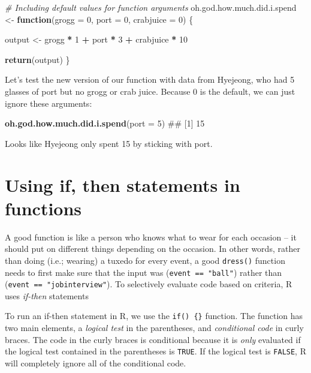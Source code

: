 \documentclass[]{book}
\newenvironment{Shaded}{\begin{snugshade}}{\end{snugshade}}
\newcommand{\KeywordTok}[1]{\textcolor[rgb]{0.13,0.29,0.53}{\textbf{#1}}}
\newcommand{\DataTypeTok}[1]{\textcolor[rgb]{0.13,0.29,0.53}{#1}}
\newcommand{\DecValTok}[1]{\textcolor[rgb]{0.00,0.00,0.81}{#1}}
\newcommand{\StringTok}[1]{\textcolor[rgb]{0.31,0.60,0.02}{#1}}
\newcommand{\CommentTok}[1]{\textcolor[rgb]{0.56,0.35,0.01}{\textit{#1}}}
\newcommand{\ControlFlowTok}[1]{\textcolor[rgb]{0.13,0.29,0.53}{\textbf{#1}}}
\newcommand{\OperatorTok}[1]{\textcolor[rgb]{0.81,0.36,0.00}{\textbf{#1}}}
\newcommand{\NormalTok}[1]{#1}
\theoremstyle{definition}
\theoremstyle{definition}
\theoremstyle{remark}
\begin{document}
\begin{Shaded}
\begin{Highlighting}[]
\CommentTok{# Including default values for function arguments}
\NormalTok{oh.god.how.much.did.i.spend <-}\StringTok{ }\ControlFlowTok{function}\NormalTok{(}\DataTypeTok{grogg =} \DecValTok{0}\NormalTok{,}
                                        \DataTypeTok{port =} \DecValTok{0}\NormalTok{,}
                                        \DataTypeTok{crabjuice =} \DecValTok{0}\NormalTok{) \{}

\NormalTok{  output <-}\StringTok{ }\NormalTok{grogg }\OperatorTok{*}\StringTok{ }\DecValTok{1} \OperatorTok{+}\StringTok{ }\NormalTok{port }\OperatorTok{*}\StringTok{ }\DecValTok{3} \OperatorTok{+}\StringTok{ }\NormalTok{crabjuice }\OperatorTok{*}\StringTok{ }\DecValTok{10}

  \KeywordTok{return}\NormalTok{(output)}
\NormalTok{\}}
\end{Highlighting}
\end{Shaded}

Let's test the new version of our function with data from Hyejeong, who
had 5 glasses of port but no grogg or crab juice. Because 0 is the
default, we can just ignore these arguments:

\begin{Shaded}
\begin{Highlighting}[]
\KeywordTok{oh.god.how.much.did.i.spend}\NormalTok{(}\DataTypeTok{port =} \DecValTok{5}\NormalTok{)}
\NormalTok{## [1] 15}
\end{Highlighting}
\end{Shaded}

Looks like Hyejeong only spent 15 by sticking with port.

\section{Using if, then statements in
functions}\label{using-if-then-statements-in-functions}

A good function is like a person who knows what to wear for each
occasion -- it should put on different things depending on the occasion.
In other words, rather than doing (i.e.; wearing) a tuxedo for every
event, a good \texttt{dress()} function needs to first make sure that
the input was (\texttt{event\ ==\ "ball"}) rather than
(\texttt{event\ ==\ "jobinterview"}). To selectively evaluate code based
on criteria, R uses \emph{if-then} statements

To run an if-then statement in R, we use the \texttt{if()\ \{\}}
function. The function has two main elements, a \emph{logical test} in
the parentheses, and \emph{conditional code} in curly braces. The code
in the curly braces is conditional because it is \emph{only} evaluated
if the logical test contained in the parentheses is \texttt{TRUE}. If
the logical test is \texttt{FALSE}, R will completely ignore all of the
conditional code.
\end{document}
